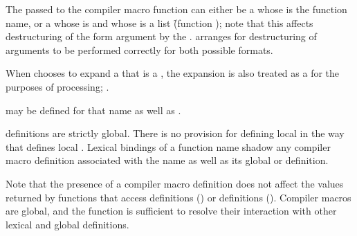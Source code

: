 The  passed to the compiler macro function can either be a 
whose  is the function name, or a  whose  is
 and whose  is a list \f{(function )};
note that this affects destructuring of the form argument by the 
.
 arranges for destructuring of arguments to be
performed correctly for both possible formats.


When  chooses to expand a  that is
a  , the expansion is also treated as a 
for the purposes of  processing; \seesection\TopLevelForms.

\endsubsubsubsection%

 
 may be defined for  that name
 as well as .  

 definitions are strictly global.  There is no provision
for defining local  in the way that 
defines local .  Lexical bindings of a function name shadow any
compiler macro definition associated with the name as well as its 
global  or  definition.
 
Note that the presence of a compiler macro definition does not affect
the values returned by
functions that access  definitions (\eg {})
or  definitions (\eg {}).
Compiler macros are global, and the function
 is sufficient to resolve their interaction
with other lexical and global definitions.

